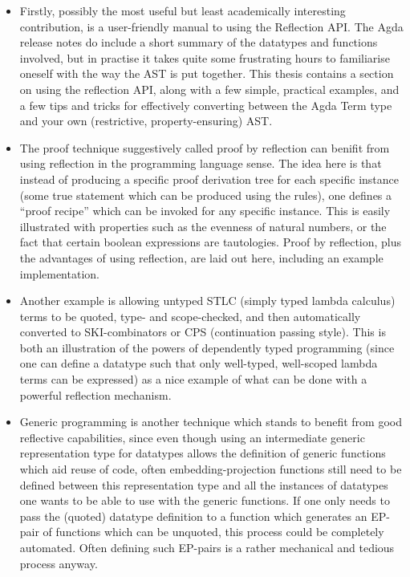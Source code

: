 \documentclass[a4paper]{article}
\begin{document}
\begin{itemize}
  \item    Firstly, possibly
           the most useful but least academically interesting contribution, is a
           user-friendly manual to using the Reflection API. The Agda release
           notes do include a short summary of the datatypes and functions
           involved, but in practise it takes quite some frustrating hours to
           familiarise oneself with the way the AST is put together. This thesis
           contains a section on using the reflection API, along with a few
           simple, practical examples, and a few tips and tricks for effectively
           converting between the Agda Term type and your own (restrictive,
           property-ensuring) AST.
  \item    The proof technique suggestively called proof by reflection can benifit
from using reflection in the programming language sense. The idea here is that instead of
producing a specific proof derivation tree for each specific instance
(some true statement which can be produced using the rules), one
defines a ``proof recipe'' which can be invoked for any specific
instance. This is easily illustrated with properties such as the
evenness of natural numbers, or the fact that certain boolean
expressions are tautologies. Proof by reflection, plus the 
advantages of using reflection, are laid out here, including an example implementation.

\item 
Another example is allowing untyped STLC (simply
typed lambda calculus) terms to be quoted, type- and scope-checked, and then automatically
converted to SKI-combinators or CPS (continuation passing style). This
is both an illustration of the powers of dependently typed programming
(since one can define a datatype such that only well-typed, well-scoped lambda
terms can be expressed) as a nice example of what can be done with
a powerful reflection mechanism.
\item 
Generic programming is another technique which stands to benefit from
good reflective capabilities, since even though using an intermediate
generic representation type for datatypes allows the definition of
generic functions which aid reuse of code, often embedding-projection
functions still need to be defined between this representation type
and all the instances of datatypes one wants to be able to use with
the generic functions. If one only needs to pass the (quoted) datatype
definition to a function which generates an EP-pair of functions which
can be unquoted, this process could be completely automated. Often
defining such EP-pairs is a rather mechanical and tedious process
anyway.


\end{itemize}
\end{document}

